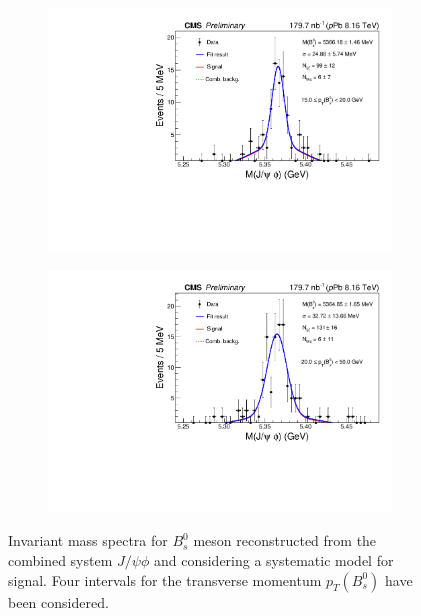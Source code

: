 \begin{figure}[htp!]
\begin{subfigure}[b]{0.475\textwidth}
		\includegraphics[width=\textwidth]{MainContent/Figs/mass/mass_BsFit_ptbins_syssig_15_20.PDF}
		\caption{}
	\end{subfigure}
	\hfill
	\begin{subfigure}[b]{0.475\textwidth}
		\centering
		\includegraphics[width=\textwidth]{MainContent/Figs/mass/mass_BsFit_ptbins_syssig_20_50.PDF}
		\caption{}%
	\end{subfigure}
	\caption{Invariant mass spectra for $B^0_s$ meson reconstructed from the combined system $J/\psi \phi$ and considering a systematic model for signal. Four intervals for the transverse momentum $p_T(B^0_s)$ have been considered.}
	\label{fig:mass_ptbins_syssig}
	
\end{figure}

